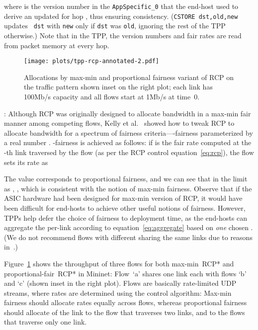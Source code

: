 \noindent where  is the version number in the {\tt AppSpecific\_0} that
the end-host used to derive an updated  for hop ,
thus ensuring consistency.  ({\tt CSTORE dst,old,new} updates {\tt
dst} with {\tt new} only if {\tt dst} was {\tt old}, ignoring the rest
of the TPP otherwise.)  Note that in the TPP, the version numbers
and fair rates are read from packet memory at every hop.




\begin{figure}[t]
\centering
\texttt{[image: plots/tpp-rcp-annotated-2.pdf]}
\caption{Allocations by max-min and proportional fairness variant of RCP
on the traffic pattern shown inset on the right plot; each link has
100Mb/s capacity and all flows start at 1Mb/s at time~0.}
\label{fig:rcp-new}\vspace{-1.2em}
\end{figure}

: Although RCP was originally designed to
allocate bandwidth in a max-min fair manner among competing flows,
Kelly et al.~\cite{kelly2008stability} showed how to tweak RCP to
allocate bandwidth for a spectrum of fairness
criteria----fairness parameterized by a real number
.  -fairness is achieved as follows: if 
is the fair rate computed at the -th link traversed by the flow (as
per the RCP control equation~\ref{eq:rcp}), the flow sets its rate as


The value  corresponds to proportional fairness, and we can
see that in the limit as , ,
which is consistent with the notion of max-min fairness.  Observe that
if the ASIC hardware had been designed for max-min version of RCP, it
would have been difficult for end-hosts to achieve other useful
notions of fairness.  However, TPPs help defer the choice of fairness
to deployment time, as the end-hosts can aggregate the per-link 
according to equation~\ref{eq:aggregate} based on \emph{one} chosen
. (We do not recommend flows with different 
sharing the same links due to reasons in~\cite{tang2007equilibrium}.)

Figure~\ref{fig:rcp-new} shows the throughput of three flows for both
max-min~RCP* and proportional-fair~RCP* in Mininet: Flow~`a' shares
one link each with flows `b' and `c' (shown inset in the right plot).
Flows are basically rate-limited UDP streams, where rates are
determined using the control algorithm: Max-min fairness should
allocate rates equally across flows, whereas proportional fairness
should allocate
 of the link to the flow that traverses two links, and
 to the flows that traverse only one link.

